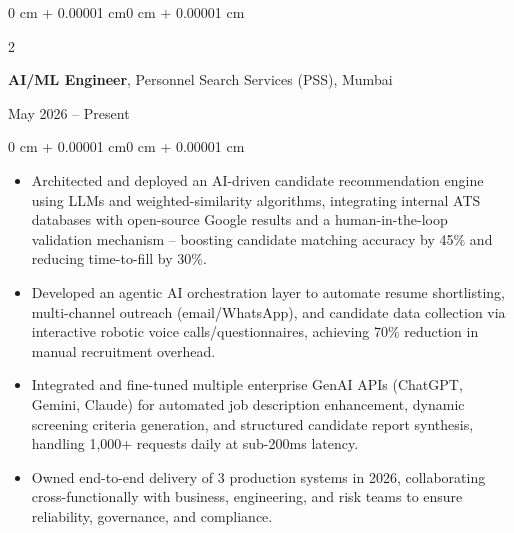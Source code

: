 \documentclass[10pt, letterpaper]{article}
\newenvironment{highlights}{
    \begin{itemize}[
        topsep=0.03 cm,
        parsep=0.02 cm,
        partopsep=0pt,
        itemsep=0.02 cm,
        leftmargin=0 cm + 8pt
    ]
}{
    \end{itemize}
}
\newenvironment{onecolentry}{
    \begin{adjustwidth}{0 cm + 0.00001 cm}{0 cm + 0.00001 cm}
}{
    \end{adjustwidth}
}
\newenvironment{twocolentry}[2][]{
    \onecolentry
    \def\secondColumn{#2}
    \setcolumnwidth{\fill, 3.5 cm}
    \begin{paracol}{2}
}{
    \switchcolumn \raggedleft \secondColumn
    \end{paracol}
    \endonecolentry
}
\begin{document}
    \begin{twocolentry}{May 2026 -- Present}
        \textbf{AI/ML Engineer}, Personnel Search Services (PSS), Mumbai
    \end{twocolentry}
    \vspace{0.03 cm}
    \begin{onecolentry}
        \begin{highlights}
            \item Architected and deployed an AI-driven candidate recommendation engine using LLMs and weighted-similarity algorithms, integrating internal ATS databases with open-source Google results and a human-in-the-loop validation mechanism – boosting candidate matching accuracy by 45\% and reducing time-to-fill by 30\%.
            \item Developed an agentic AI orchestration layer to automate resume shortlisting, multi-channel outreach (email/WhatsApp), and candidate data collection via interactive robotic voice calls/questionnaires, achieving 70\% reduction in manual recruitment overhead.
            \item Integrated and fine-tuned multiple enterprise GenAI APIs (ChatGPT, Gemini, Claude) for automated job description enhancement, dynamic screening criteria generation, and structured candidate report synthesis, handling 1,000+ requests daily at sub-200ms latency.
            \item Owned end-to-end delivery of 3 production systems in 2026, collaborating cross-functionally with business, engineering, and risk teams to ensure reliability, governance, and compliance.
        \end{highlights}
    \end{onecolentry}

    \vspace{0.06 cm}
\end{document}
